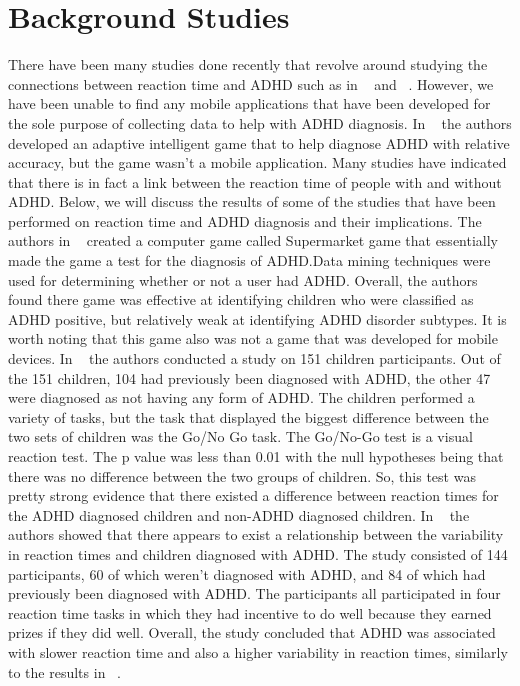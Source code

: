 \documentclass[a4wide]{article}
\begin{document}
\section{Background Studies}
\- There have been many studies done recently that revolve around studying the connections between reaction time and ADHD such as in ~\cite{pmid24628425} and ~\cite{Mostofsky:2008:RIR:1362432.1362433}. However, we have been unable to find any mobile applications that have been developed for the sole purpose of collecting data to help with ADHD diagnosis. In ~\cite{Andrade:2006:SGA:1190617.1191298} the authors developed an adaptive intelligent game that to help diagnose ADHD with relative accuracy, but the game wasn't a mobile application. Many studies have indicated that there is in fact a link between the reaction time of people with and without ADHD. Below, we will discuss the results of some of the studies that have been performed on reaction time and ADHD diagnosis and their implications.
\newline
\newline
\- The authors in ~\cite{Santos:2011:AAT:2006075.2006688} created a computer game called Supermarket game that essentially made the game a test for the diagnosis of ADHD.Data mining techniques were used for determining whether or not a user had ADHD. Overall, the authors found there game was effective at identifying children who were classified as ADHD positive, but relatively weak at identifying ADHD disorder subtypes. It is worth noting that this game also was not a game that was developed for mobile devices.
\newline
\newline
\- In ~\cite{pmid21463041} the authors conducted a study on 151 children participants. Out of the 151 children, 104 had previously been diagnosed with ADHD, the other 47 were diagnosed as not having any form of ADHD. The children performed a variety of tasks, but the task that displayed the biggest difference between the two sets of children was the Go/No Go task. The Go/No-Go test is a visual reaction test. The p value was less than 0.01 with the null hypotheses being that there was no difference between the two groups of children. So, this test was pretty strong evidence that there existed a difference between reaction times for the ADHD diagnosed children and non-ADHD diagnosed children.
\newline
\newline
\- In ~\cite{pmid17537284} the authors showed that there appears to exist a relationship between the variability in reaction times and children diagnosed with ADHD. The study consisted of 144 participants, 60 of which weren't diagnosed with ADHD, and 84 of which had previously been diagnosed with ADHD. The participants all participated in four reaction time tasks in which they had incentive to do well because they earned prizes if they did well. Overall, the study concluded that ADHD was associated with slower reaction time and also a higher variability in reaction times, similarly to the results in ~\cite{pmid21463041}.
\newline
\newline
\end{document}
